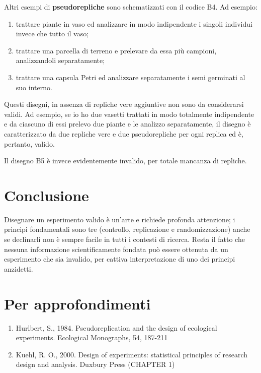 \documentclass[a4paper,12pt,oneside]{book}
\providecommand{\tightlist}{%
  \setlength{\itemsep}{0pt}\setlength{\parskip}{0pt}}
\theoremstyle{definition}
\theoremstyle{definition}
\theoremstyle{definition}
\theoremstyle{remark}
\begin{document}
Altri esempi di \textbf{pseudorepliche} sono schematizzati con il codice
B4. Ad esempio:

\begin{enumerate}
\def\labelenumi{\arabic{enumi}.}
\tightlist
\item
  trattare piante in vaso ed analizzare in modo indipendente i singoli
  individui invece che tutto il vaso;
\item
  trattare una parcella di terreno e prelevare da essa più campioni,
  analizzandoli separatamente;
\item
  trattare una capsula Petri ed analizzare separatamente i semi
  germinati al suo interno.
\end{enumerate}

Questi disegni, in assenza di repliche vere aggiuntive non sono da
considerarsi validi. Ad esempio, se io ho due vasetti trattati in modo
totalmente indipendente e da ciascuno di essi prelevo due piante e le
analizzo separatamente, il disegno è caratterizzato da due repliche vere
e due pseudorepliche per ogni replica ed è, pertanto, valido.

Il disegno B5 è invece evidentemente invalido, per totale mancanza di
repliche.

\section{Conclusione}\label{conclusione}

Disegnare un esperimento valido è un'arte e richiede profonda
attenzione; i principi fondamentali sono tre (controllo, replicazione e
randomizzazione) anche se declinarli non è sempre facile in tutti i
contesti di ricerca. Resta il fatto che nessuna informazione
scientificamente fondata può essere ottenuta da un esperimento che sia
invalido, per cattiva interpretazione di uno dei principi anzidetti.

\section{Per approfondimenti}\label{per-approfondimenti}

\begin{enumerate}
\def\labelenumi{\arabic{enumi}.}
\tightlist
\item
  Hurlbert, S., 1984. Pseudoreplication and the design of ecological
  experiments. Ecological Monographs, 54, 187-211
\item
  Kuehl, R. O., 2000. Design of experiments: statistical principles of
  research design and analysis. Duxbury Press (CHAPTER 1)
\end{enumerate}
\end{document}
